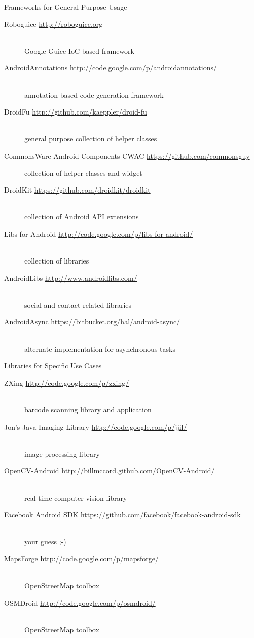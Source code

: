 \documentclass[aspectratio=169]{beamer}
\newcommand{\surl}[1] {{\tiny \url{#1}}}
\begin{document}
    \begin{frame}{Frameworks for General Purpose Usage}
      \begin{description}
        \item[Roboguice \surl{http://roboguice.org}] \hfill \\ Google Guice IoC based framework  
        \item[AndroidAnnotations \surl{http://code.google.com/p/androidannotations/}] \hfill \\ annotation based code generation framework
        \item[DroidFu \surl{http://github.com/kaeppler/droid-fu}] \hfill \\ general purpose collection of helper classes
        \item[CommonsWare Android Components CWAC \surl{https://github.com/commonsguy}] collection of helper classes and widget
        \item[DroidKit \surl{https://github.com/droidkit/droidkit}] \hfill \\ collection of Android API extensions
        \item[Libs for Android \surl{http://code.google.com/p/libs-for-android/}] \hfill \\ collection of libraries
        \item[AndroidLibs \surl{http://www.androidlibs.com/}] \hfill \\ social and contact related libraries
        \item[AndroidAsync \surl{https://bitbucket.org/hal/android-async/}] \hfill \\ alternate implementation for asynchronous tasks  
      \end{description}
    \end{frame}
  
  \begin{frame}{Libraries for Specific Use Cases}
      \begin{description}
        \item[ZXing \surl{http://code.google.com/p/zxing/}] \hfill \\ barcode scanning library and application
        \item[Jon's Java Imaging Library \surl{http://code.google.com/p/jjil/}] \hfill \\ image processing library
        \item[OpenCV-Android \surl{http://billmccord.github.com/OpenCV-Android/}] \hfill \\ real time computer vision library
        \item[Facebook Android SDK \surl{https://github.com/facebook/facebook-android-sdk}] \hfill \\ your guess ;-)
        \item[MapsForge \surl{http://code.google.com/p/mapsforge/}] \hfill \\ OpenStreetMap toolbox
        \item[OSMDroid \surl{http://code.google.com/p/osmdroid/}] \hfill \\ OpenStreetMap toolbox
      \end{description}
    \end{frame}
\end{document}
